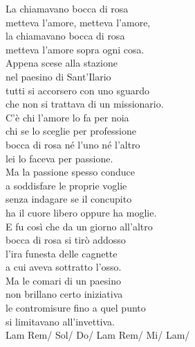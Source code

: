 \documentclass[10pt, twoside, a4paper]{article}
\begin{document}
\begin{multicols}{2}

La chiamavano bocca di rosa \\
metteva l'amore, metteva l'amore, \\
la chiamavano bocca di rosa \\
metteva l'amore sopra ogni cosa. \\

Appena scese alla stazione \\
nel paesino di Sant'Ilario \\
tutti si accorsero con uno sguardo \\
che non si trattava di un missionario. \\

C'\`e chi l'amore lo fa per noia \\
chi se lo sceglie per professione \\
bocca di rosa n\'e l'uno n\'e l'altro \\
lei lo faceva per passione. \\

Ma la passione spesso conduce \\
a soddisfare le proprie voglie \\
senza indagare se il concupito \\
ha il cuore libero oppure ha moglie. \\

E fu cos\`i che da un giorno all'altro \\
bocca di rosa si tir\`o addosso \\
l'ira funesta delle cagnette \\
a cui aveva sottratto l'osso. \\

Ma le comari di un paesino \\
non brillano certo iniziativa \\
le contromisure fino a quel punto \\
si limitavano all'invettiva. \\

Lam Rem/ Sol/ Do/ Lam Rem/ Mi/ Lam/
\newline
\newline


\end{multicols}
\end{document}
